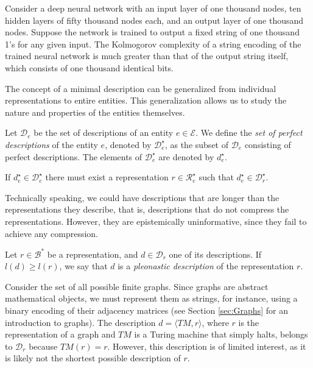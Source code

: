 \begin{example}
\label{ex:description_neural}
Consider a deep neural network with an input layer of one thousand nodes, ten hidden layers of fifty thousand nodes each, and an output layer of one thousand nodes. Suppose the network is trained to output a fixed string of one thousand 1's for any given input. The Kolmogorov complexity of a string encoding of the trained neural network is much greater than that of the output string itself, which consists of one thousand identical bits.
\end{example}

The concept of a minimal description can be generalized from individual representations to entire entities. This generalization allows us to study the nature and properties of the entities themselves.

\begin{definition}
\label{def:entities_perfect_model}
Let $\mathcal{D}_e$ be the set of descriptions of an entity $e \in \mathcal{E}$. We define the \emph{set of perfect descriptions} of the entity $e$, denoted by $\mathcal{D}^\star_e$, as the subset of $\mathcal{D}_e$ consisting of perfect descriptions. The elements of $\mathcal{D}^\star_e$ are denoted by $d^\star_e$.
\end{definition}

If $d^\star_e \in \mathcal{D}^\star_e$ there must exist a representation $r \in \mathcal{R}^\star_e$ such that $d^\star_e \in \mathcal{D}^\star_r$.

Technically speaking, we could have descriptions that are longer than the representations they describe, that is, descriptions that do not compress the representations. However, they are epistemically uninformative, since they fail to achieve any compression.

\begin{definition}
\label{def:trivial_model}
Let $r \in \mathcal{B}^\ast$ be a representation, and $d \in \mathcal{D}_r$ one of its descriptions. If $l(d) \geq l(r)$, we say that $d$ is a \emph{pleonastic description} of the representation $r$.
\end{definition}

\begin{example}
\label{ex:topics_models_graph}
Consider the set of all possible finite graphs. Since graphs are abstract mathematical objects, we must represent them as strings, for instance, using a binary encoding of their adjacency matrices (see Section \ref{sec:Graphs} for an introduction to graphs). The description $d = \langle TM, r \rangle$, where $r$ is the representation of a graph and $TM$ is a Turing machine that simply halts, belongs to $\mathcal{D}_r$ because $TM(r) = r$. However, this description is of limited interest, as it is likely not the shortest possible description of $r$.
\end{example}

